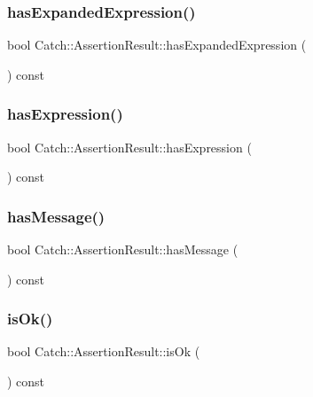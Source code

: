 \subsubsection{\texorpdfstring{has\+Expanded\+Expression()}{hasExpandedExpression()}}
{\footnotesize\ttfamily bool Catch\+::\+Assertion\+Result\+::has\+Expanded\+Expression (\begin{DoxyParamCaption}{ }\end{DoxyParamCaption}) const}

\mbox{\label{class_catch_1_1_assertion_result_aba37b4fef1015989df2136592958e984}} 
\subsubsection{\texorpdfstring{has\+Expression()}{hasExpression()}}
{\footnotesize\ttfamily bool Catch\+::\+Assertion\+Result\+::has\+Expression (\begin{DoxyParamCaption}{ }\end{DoxyParamCaption}) const}

\mbox{\label{class_catch_1_1_assertion_result_aae37064b401919fa8ac480ef86cca924}} 
\subsubsection{\texorpdfstring{has\+Message()}{hasMessage()}}
{\footnotesize\ttfamily bool Catch\+::\+Assertion\+Result\+::has\+Message (\begin{DoxyParamCaption}{ }\end{DoxyParamCaption}) const}

\mbox{\label{class_catch_1_1_assertion_result_ae39658b71c4afc3c8a859043b0e97027}} 
\subsubsection{\texorpdfstring{is\+Ok()}{isOk()}}
{\footnotesize\ttfamily bool Catch\+::\+Assertion\+Result\+::is\+Ok (\begin{DoxyParamCaption}{ }\end{DoxyParamCaption}) const}

